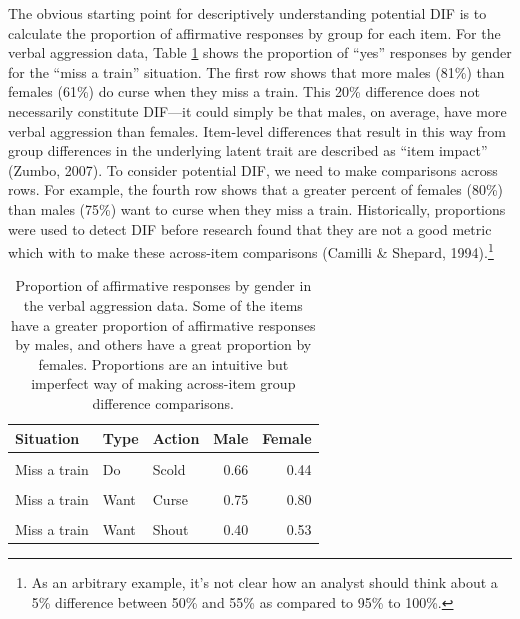 \documentclass[
  english,
  man,floatsintext]{apa6}
\begin{document}
The obvious starting point for descriptively understanding potential DIF is to calculate the proportion of affirmative responses by group for each item. For the verbal aggression data, Table \ref{tab:pvalues} shows the proportion of ``yes'' responses by gender for the ``miss a train'' situation. The first row shows that more males (81\%) than females (61\%) do curse when they miss a train. This 20\% difference does not necessarily constitute DIF---it could simply be that males, on average, have more verbal aggression than females. Item-level differences that result in this way from group differences in the underlying latent trait are described as ``item impact'' (Zumbo, 2007). To consider potential DIF, we need to make comparisons across rows. For example, the fourth row shows that a greater percent of females (80\%) than males (75\%) want to curse when they miss a train. Historically, proportions were used to detect DIF before research found that they are not a good metric which with to make these across-item comparisons (Camilli \& Shepard, 1994).\footnote{As an arbitrary example, it's not clear how an analyst should think about a 5\% difference between 50\% and 55\% as compared to 95\% to 100\%.}

\begin{table}[H]

\caption{\label{tab:pvalues}Proportion of affirmative responses by gender in the verbal aggression data. Some of the items have a greater proportion of affirmative responses by males, and others have a great proportion by females. Proportions are an intuitive but imperfect way of making across-item group difference comparisons.}
\centering
\fontsize{10}{12}\selectfont
\begin{tabular}[t]{lllrr}
\toprule
Situation & Type & Action & Male & Female\\
\midrule
\cellcolor{gray!6}{Miss a train} & \cellcolor{gray!6}{Do} & \cellcolor{gray!6}{Curse} & \cellcolor{gray!6}{0.81} & \cellcolor{gray!6}{0.61}\\
Miss a train & Do & Scold & 0.66 & 0.44\\
\cellcolor{gray!6}{Miss a train} & \cellcolor{gray!6}{Do} & \cellcolor{gray!6}{Shout} & \cellcolor{gray!6}{0.29} & \cellcolor{gray!6}{0.23}\\
Miss a train & Want & Curse & 0.75 & 0.80\\
\cellcolor{gray!6}{Miss a train} & \cellcolor{gray!6}{Want} & \cellcolor{gray!6}{Scold} & \cellcolor{gray!6}{0.60} & \cellcolor{gray!6}{0.63}\\
\addlinespace
Miss a train & Want & Shout & 0.40 & 0.53\\
\bottomrule
\end{tabular}
\end{table}
\end{document}
